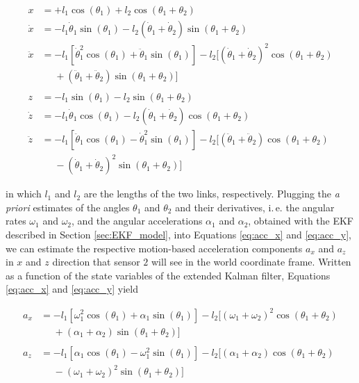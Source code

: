 \begin{align}
  x &= + l_1 \cos(\theta_1) + l_2 \cos(\theta_1 + \theta_2) \\
  \dot{x} &= -l_1 \dot{\theta}_1 \sin(\theta_1) - l_2 (\dot{\theta}_1 + \dot{\theta}_2) \sin(\theta_1 + \theta_2) \\
  \ddot{x} &= -l_1 [\dot{\theta}^2_1 \cos(\theta_1) + \ddot{\theta}_1 \sin(\theta_1)] - l_2 [(\dot{\theta}_1 + \dot{\theta}_2)^2 \cos(\theta_1 + \theta_2) \nonumber \\ 
  &\mathrel{\phantom{=}} + (\ddot{\theta}_1 + \ddot{\theta}_2) \sin(\theta_1 + \theta_2)] \label{eq:acc_x} \\
  \nonumber \\
  z &= -l_1 \sin(\theta_1) - l_2 \sin(\theta_1 + \theta_2) \\
  \dot{z} &= -l_1 \dot{\theta}_1 \cos(\theta_1) - l_2 (\dot{\theta}_1 + \dot{\theta}_2) \cos(\theta_1 + \theta_2) \\
  \ddot{z} {}&= -l_1 [\ddot{\theta}_1 \cos(\theta_1) - \dot{\theta}^2_1 \sin(\theta_1)] - l_2 [(\ddot{\theta}_1 + \ddot{\theta}_2) \cos(\theta_1 + \theta_2) \nonumber \\ 
  &\mathrel{\phantom{=}} - (\dot{\theta}_1 + \dot{\theta}_2)^2 \sin(\theta_1 + \theta_2)] \label{eq:acc_y}
\end{align}

\noindent
in which $l_1$ and $l_2$ are the lengths of the two links, respectively. Plugging the \emph{a priori} estimates of the angles $\theta_1$ and $\theta_2$ and their derivatives, i.\,e. the angular rates $\omega_1$ and $\omega_2$, and the angular accelerations $\alpha_1$ and $\alpha_2$, obtained with the EKF described in Section \ref{sec:EKF_model}, into Equations \ref{eq:acc_x} and \ref{eq:acc_y}, we can estimate the respective motion-based acceleration components $a_x$ and $a_z$ in $x$ and $z$ direction that sensor $2$ will see in the world coordinate frame. Written as a function of the state variables of the extended Kalman filter, Equations \ref{eq:acc_x} and \ref{eq:acc_y} yield

\begin{align}
  a_x &= -l_1 [\omega^2_1 \cos(\theta_1) + \alpha_1 \sin(\theta_1)] - l_2 [(\omega_1 + \omega_2)^2 \cos(\theta_1 + \theta_2) \nonumber \\ 
  &\mathrel{\phantom{=}} + (\alpha_1 + \alpha_2) \sin(\theta_1 + \theta_2)] \label{eq:acc_x_state} \\
  \nonumber \\
  a_z {}&= -l_1 [\alpha_1 \cos(\theta_1) - \omega^2_1 \sin(\theta_1)] - l_2 [(\alpha_1 + \alpha_2) \cos(\theta_1 + \theta_2) \nonumber \\ 
  &\mathrel{\phantom{=}} - (\omega_1 + \omega_2)^2 \sin(\theta_1 + \theta_2)] \label{eq:acc_y_state}
\end{align}

